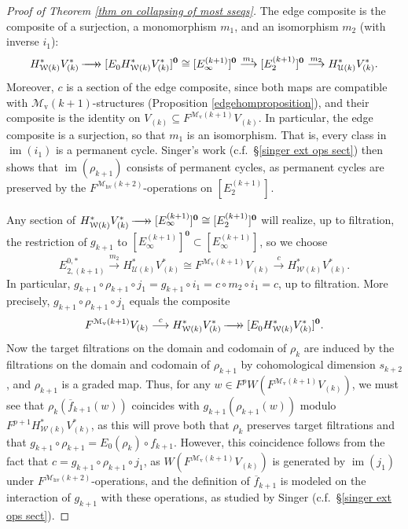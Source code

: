 \documentclass[11pt]{amsart} \renewcommand{\baselinestretch}{1.2}
\theoremstyle{plain}
\numberwithin{equation}{section} %
\theoremstyle{plain}
\numberwithin{equation}{chapter} %
\DeclareMathOperator{\im}{im}
\renewcommand{\to}{\longrightarrow}
\newcommand{\calU}{\mathcal{U}}
\newcommand{\calw}{\mathcal{W}}
\newcommand{\calMv}{\mathcal{M}\dver}
\newcommand{\calMhv}{\mathcal{M}_\mathrm{hv}}
\newcommand{\epi}{{\,\makebox[0cm][l]{\ensuremath\to}\to{}}}
\newcommand{\E}[5]{[E^{#1}_{#2}#3]^{#4}_{#5}}
\newcommand{\dver}{_\mathrm{v}}
\begin{document}
\begin{Calculations of HWn}
\begin{proof}[Proof of Theorem \ref{thm on collapsing of most sseqs}]
The edge composite is the composite of a surjection, a monomorphism $m_1$, and an isomorphism $m_2$ (with inverse $i_1$):
\[H^*_{\calw(k)}V^*_{(k)}\epi 
\E{}{0}{H^*_{\calw(k)}V^*_{(k)}}{\textbf{0}}{}
\cong
\E{(k+1)}{\infty}{}{\textbf{0}}{}
\overset{m_1}{\to} \E{(k+1)}{2}{}{\textbf{0}}{}
\overset{m_2}{\to}H^*_{\calU(k)}V^*_{(k)}.\]
Moreover, $c$ is a section of the edge composite, since both maps are compatible with $\calMv(k+1)$-structures (Proposition \ref{edgehomproposition}), and their composite is the identity on $V_{(k)}\subseteq  F^{\calMv(k+1)}V_{(k)}$.
In particular, the edge composite is a surjection, so that $m_{1}$ is an isomorphism. That is, every class in $\im(i_1)$ is a permanent cycle. Singer's work (c.f.\ \S\ref{singer ext ops sect}) then shows that $\im(\rho_{k+1})$ consists of permanent cycles, as permanent cycles are preserved by the $F^{\calMhv(k+2)}$-operations on $\E{(k+1)}{2}{}{}{}$.


Any section of $H^*_{\calw(k)}V^*_{(k)}\epi \E{(k+1)}{\infty}{}{\textbf{0}}{}\cong \E{(k+1)}{2}{}{\textbf{0}}{} $ will realize, up to filtration, the restriction of $g_{k+1}$ to $\E{(k+1)}{\infty}{}{\textbf{0}}{} \subset \E{(k+1)}{\infty}{}{}{}$, so we choose
\[E_{2,(k+1)}^{0,*}\overset{m_2}{\to} H^*_{\calU(k)}V^*_{(k)}\cong F^{\calMv(k+1)}V_{(k)}\overset{c}{\to}H^*_{\calw(k)}V^*_{(k)}.\]
In particular, $g_{k+1}\circ \rho_{k+1}\circ j_1=g_{k+1}\circ i_1=c\circ m_2\circ i_1=c$, up to filtration. More precisely, $g_{k+1}\circ \rho_{k+1}\circ j_1$ equals the composite
\[
F^{\calMv(k+1)}V_{(k)}\overset{c}{\to} H^*_{\calw(k)}V^*_{(k)}\epi \E{}{0}{H^*_{\calw(k)}V^*_{(k)}}{\textbf{0}}{}.
\]
Now the target filtrations on the domain and codomain of $\rho_k$ are induced by the filtrations on the domain and codomain of $\rho_{k+1}$ by cohomological dimension $s_{k+2}$, and $\rho_{k+1}$ is a graded map. Thus, for any $w\in F^pW(F^{\calMv(k+1)}V_{(k)})$, we must see that $\rho_k(\overline{f}_{k+1}(w))$ coincides with $g_{k+1}(\rho_{k+1}(w))$ modulo $F^{p+1}H^*_{\calw(k)}V^*_{(k)}$, as this will prove both that $\rho_k$ preserves target filtrations and that  $g_{k+1}\circ \rho_{k+1}=E_0(\rho_{k})\circ f_{k+1}$. However, this coincidence follows from the fact that $c=g_{k+1}\circ \rho_{k+1}\circ j_1$, as $W(F^{\calMv(k+1)}V_{(k)})$ is generated by $\im(j_1)$ under $F^{\calMhv(k+2)}$-operations, and the definition of $\overline{f}_{k+1}$ is modeled on the interaction of $g_{k+1}$ with these operations, as studied by Singer (c.f.\ \S\ref{singer ext ops sect}).


\end{proof}
\end{Calculations of HWn}
\end{document}
